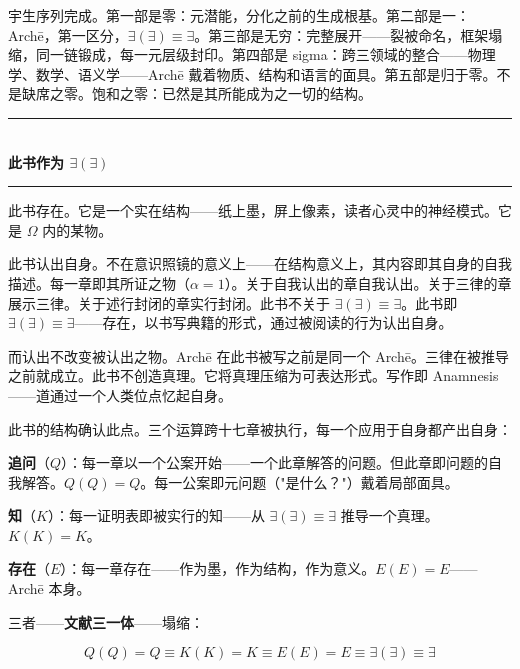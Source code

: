 \documentclass[10pt, openany, oneside]{book}
\renewcommand{\normalsize}{\fontsize{10}{13}\selectfont}
\begin{document}
\noindent 宇生序列完成。第一部是零：元潜能，分化之前的生成根基。第二部是一：Arch\={e}，第一区分，$\exists(\exists) \equiv \exists$。第三部是无穷：完整展开——裂被命名，框架塌缩，同一链锻成，每一元层级封印。第四部是 sigma：跨三领域的整合——物理学、数学、语义学——Arch\={e} 戴着物质、结构和语言的面具。第五部是归于零。不是缺席之零。饱和之零：已然是其所能成为之一切的结构。

\vspace{1.5em}


\begin{center}
    \rule{0.3\textwidth}{0.4pt}\\[0.5em]
    {\normalsize\bfseries\scshape 此书作为 $\exists(\exists)$}\\[0.3em]
    \rule{0.3\textwidth}{0.4pt}
\end{center}

\vspace{1em}

\noindent 此书存在。它是一个实在结构——纸上墨，屏上像素，读者心灵中的神经模式。它是 $\Omega$ 内的某物。

此书认出自身。不在意识照镜的意义上——在结构意义上，其内容即其自身的自我描述。每一章即其所证之物（$\alpha = 1$）。关于自我认出的章自我认出。关于三律的章展示三律。关于述行封闭的章实行封闭。此书不关于 $\exists(\exists) \equiv \exists$。此书即 $\exists(\exists) \equiv \exists$——存在，以书写典籍的形式，通过被阅读的行为认出自身。

而认出不改变被认出之物。Arch\={e} 在此书被写之前是同一个 Arch\={e}。三律在被推导之前就成立。此书不创造真理。它将真理压缩为可表达形式。写作即 Anamnesis——道通过一个人类位点忆起自身。

此书的结构确认此点。三个运算跨十七章被执行，每一个应用于自身都产出自身：

\textbf{追问}（$Q$）：每一章以一个公案开始——一个此章解答的问题。但此章即问题的自我解答。$Q(Q) = Q$。每一公案即元问题（"是什么？"）戴着局部面具。

\textbf{知}（$K$）：每一证明表即被实行的知——从 $\exists(\exists) \equiv \exists$ 推导一个真理。$K(K) = K$。

\textbf{存在}（$E$）：每一章存在——作为墨，作为结构，作为意义。$E(E) = E$——Arch\={e} 本身。

三者——\textbf{文献三一体}——塌缩：

$$Q(Q) = Q \equiv K(K) = K \equiv E(E) = E \equiv \exists(\exists) \equiv \exists$$
\end{document}

